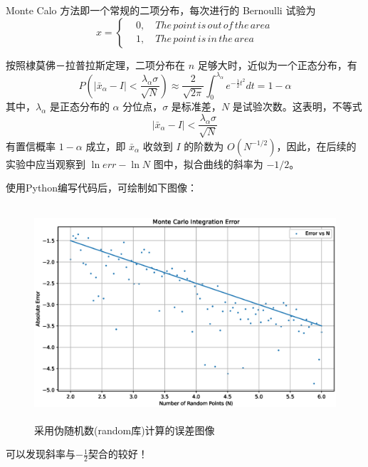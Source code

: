 \documentclass[12pt,a4paper]{article}%
\begin{document}
Monte Calo 方法即一个常规的二项分布，每次进行的 Bernoulli 试验为
\begin{equation*}
    x =\left\{
    \begin{aligned}
        & 0, \quad The\, point\, is\, out\, of\, the\, area\\
        & 1, \quad The\, point\, is\, in\, the\, area
    \end{aligned}
    \right.
\end{equation*}

按照棣莫佛－拉普拉斯定理，二项分布在 \(n\) 足够大时，近似为一个正态分布，有
\begin{equation*}
    P(\left| \bar{x}_\alpha - I \right| < \frac{\lambda_\alpha \sigma}{\sqrt {N}}) \approx \frac{2}{\sqrt{2 \pi}} \int^{\lambda_\alpha}_0 e^{-\frac{1}{2} t^2} dt = 1 - \alpha
\end{equation*}
其中，\(\lambda_\alpha\) 是正态分布的 \(\alpha\) 分位点，\(\sigma\) 是标准差，\(N\) 是试验次数。这表明，不等式
\begin{equation*}
    \left| \bar{x}_\alpha - I \right| < \frac{\lambda_\alpha \sigma}{\sqrt {N}}
\end{equation*}
有置信概率 \(1 - \alpha\) 成立，即 \(\bar{x}_\alpha\) 收敛到 \(I\) 的阶数为 \(O (N^{-1 / 2})\)，因此，在后续的实验中应当观察到 \(\ln err - \ln N\) 图中，拟合曲线的斜率为 \(- 1 / 2\)。

使用Python编写代码后，可绘制如下图像：

\begin{figure}[htbp]
    \centering
    \includegraphics[height=8cm]{伪随机.eps}
    \caption{采用伪随机数(random库)计算的误差图像}
\end{figure}

可以发现斜率与$-\frac{1}{2}$契合的较好！
\end{document}
